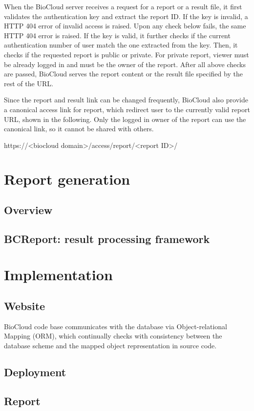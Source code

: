 When the BioCloud server receives a request for a report or a result file, it
first validates the authentication key and extract the report ID. If the key is
invalid, a HTTP 404 error of invalid access is raised. Upon any check below
fails, the same HTTP 404 error is raised. If the key is valid, it further
checks if the current authentication number of user match the one extracted
from the key. Then, it checks if the requested report is public or private. For
private report, viewer must be already logged in and must be the owner of the
report. After all above checks are passed, BioCloud serves the report content
or the result file specified by the rest of the URL.

Since the report and result link can be changed frequently, BioCloud also
provide a canonical access link for report, which redirect user to the
currently valid report URL, shown in the following. Only the logged in owner of
the report can use the canonical link, so it cannot be shared with others.

\begin{CVerbatim}[fontsize=\small]
https://<biocloud domain>/access/report/<report ID>/
\end{CVerbatim}




\section{Report generation}
\label{s:report-generation}

\subsection{Overview}



\subsection{BCReport: result processing framework}



\section{Implementation}

\subsection{Website}


BioCloud code base communicates with the database via Object-relational Mapping
(ORM), which continually checks with consistency between the database scheme
and the mapped object representation in source code.



\subsection{Deployment}

\subsection{Report}
